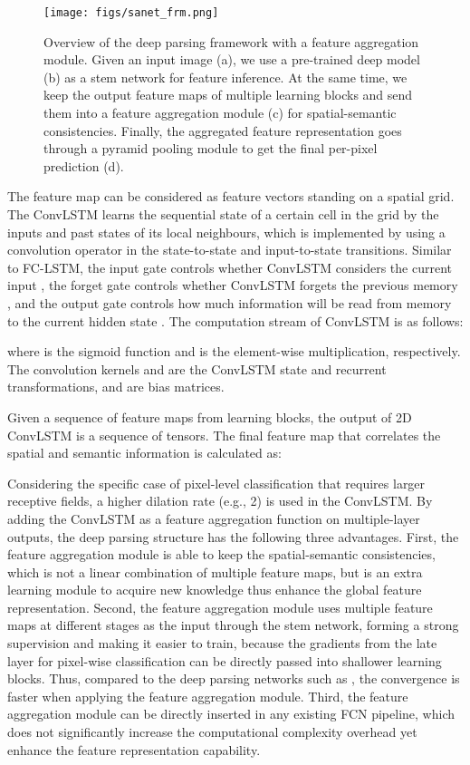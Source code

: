 \documentclass[10pt,twocolumn,twoside]{IEEEtran}
\begin{document}
\begin{figure*}[t!]
\centering
    \texttt{[image: figs/sanet\_frm.png]}   
    \caption{Overview of the deep parsing framework with a feature aggregation module. Given an input image (a), we use a pre-trained deep model (b) as a stem network for feature inference. At the same time, we keep the output feature maps of multiple learning blocks and send them into a feature aggregation module (c) for spatial-semantic consistencies. Finally, the aggregated feature representation goes through a pyramid pooling module to get the final per-pixel prediction (d).}
\label{FIG:FRM}
\end{figure*}

The feature map  can be considered as  feature vectors standing on a spatial grid. The ConvLSTM learns the sequential state of a certain cell in the grid by the inputs and past states of its local neighbours, which is implemented by using a convolution operator in the state-to-state and input-to-state transitions. Similar to FC-LSTM, the input gate  controls whether ConvLSTM considers the current input , the forget gate  controls whether ConvLSTM forgets the previous memory , and the output gate  controls how much information will be read from memory  to the current hidden state . The computation stream of ConvLSTM is as follows:


where  is the sigmoid function and  is the element-wise multiplication, respectively. The convolution kernels  and  are the ConvLSTM state and recurrent transformations, and  are bias matrices.

Given a sequence of feature maps  from  learning blocks, the output of 2D ConvLSTM is a sequence of tensors. The final feature map that correlates the spatial and semantic information is calculated as:



Considering the specific case of pixel-level classification that requires larger receptive fields, a higher dilation rate (e.g., 2) is used in the ConvLSTM. By adding the ConvLSTM as a feature aggregation function on multiple-layer outputs, the deep parsing structure has the following three advantages. First, the feature aggregation module is able to keep the spatial-semantic consistencies, which is not a linear combination of multiple feature maps, but is an extra learning module to acquire new knowledge thus enhance the global feature representation. Second, the feature aggregation module uses multiple feature maps at different stages as the input through the stem network, forming a strong supervision and making it easier to train, because the gradients from the late layer for pixel-wise classification can be directly passed into shallower learning blocks. Thus, compared to the deep parsing networks such as \cite{CVPR17:PSPNET,CVPR19:DANET}, the convergence is faster when applying the feature aggregation module. Third, the feature aggregation module can be directly inserted in any existing FCN pipeline, which does not significantly increase the computational complexity overhead yet enhance the feature representation capability. 
\end{document}
